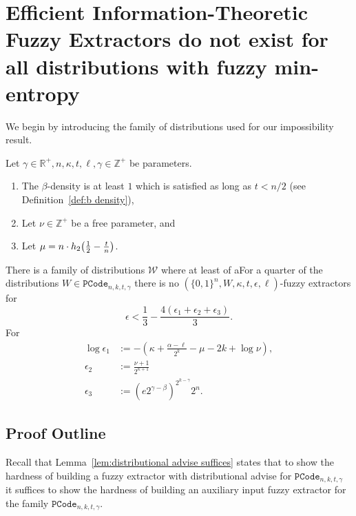 

\section{Efficient Information-Theoretic Fuzzy Extractors do not exist for all distributions with fuzzy min-entropy}
\label{sec:fe}
We begin by introducing the family of distributions used for our impossibility result.



\begin{theorem}
Let $\gamma \in\mathbb{R}^+, n, \kappa, t, \ell, \gamma \in\mathbb{Z}^+$ be parameters. 
\begin{enumerate}
\itemsep0em
\item The $\beta$-density is at least $1$ which is  satisfied as long as $t< n/2 $ (see Definition~\ref{def:b density}),
\item Let $\nu \in \mathbb{Z}^+$ be a free parameter, and
\item Let $\mu =  n \cdot h_2\!\left(\frac{1}{2} - \frac{t}{n}\right)$.
\end{enumerate}
There is a family of distributions $\mathcal{W}$ where at least of aFor a quarter of the distributions $W\in \mathtt{PCode}_{n, k, t, \gamma}$ there is no $(\{0,1\}^n, W, \kappa, t, \epsilon, \ell)$-fuzzy extractors for 
\[
\epsilon< \frac{1}{3} - \frac{4(\epsilon_1+\epsilon_2+\epsilon_3)}{3}.
\]
For 
\begin{align*}\log{\epsilon_1}&:= -\left(\kappa+\frac{\alpha -\ell}{2^k} - \mu -2k+\log{\nu}\right),\\
\epsilon_2&:=\frac{\nu+1}{2^{\kappa+1}}\\
\epsilon_3&:=\left(e2^{\gamma-\beta}\right)^{2^{k-\gamma}}2^n.
\end{align*}
\label{thm:main theorem}
\end{theorem}

\subsection{Proof Outline}
Recall that Lemma~\ref{lem:distributional advise suffices} states that to show the hardness of building a fuzzy extractor with distributional advise for $\mathtt{PCode}_{n, k, t, \gamma}$ it suffices to show the hardness of building an auxiliary input fuzzy extractor for the family $\mathtt{PCode}_{n, k, t, \gamma}$. 

